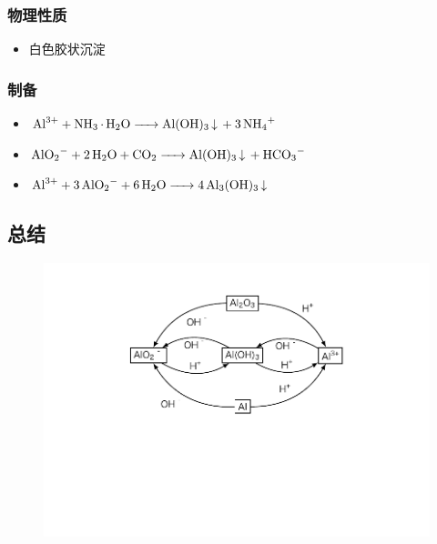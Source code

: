 \subsubsection{物理性质}

\begin{itemize}
	\item 白色胶状沉淀
\end{itemize}

\subsubsection{制备}

\begin{itemize}
	\item $\ce{Al^3+ + NH3*H2O -> Al(OH)3 v + 3NH4+}\\$
	\item $\ce{AlO2- + 2H2O + CO2 -> Al(OH)3 v + HCO3-}\\$
	\item $\ce{Al^3+ + 3AlO2- + 6H2O -> 4Al3(OH)3 v}\\$
\end{itemize}


\subsection{总结}

\begin{figure}[h]
	 \centering\includegraphics[scale=0.8]{res/Al.pdf}
\end{figure}
